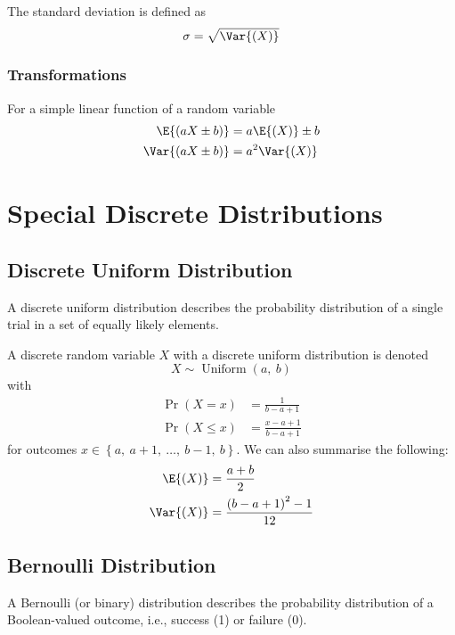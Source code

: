 \documentclass{article}
\begin{document}
\begin{definition}
    The standard deviation is defined as
    \begin{equation*}
        \sigma = \sqrt{\Var{\left( X \right)}}
    \end{equation*}
\end{definition}
\subsubsection{Transformations}
For a simple linear function of a random variable
\begin{align*}
    \E{\left( aX \pm b \right)}   & = a\E{\left( X \right)} \pm b \\
    \Var{\left( aX \pm b \right)} & = a^2\Var{\left( X \right)}
\end{align*}
\section{Special Discrete Distributions}
\subsection{Discrete Uniform Distribution}
A discrete uniform distribution describes the probability distribution of a single trial
in a set of equally likely elements.

A discrete random variable \(X\) with a discrete uniform distribution is denoted
\begin{equation*}
    X \sim \operatorname{Uniform}{\left( a,\: b \right)}
\end{equation*}
with
\begin{align*}
    \Pr{\left( X = x \right)}    & = \frac{1}{b - a + 1}         \\
    \Pr{\left( X \leq x \right)} & = \frac{x - a + 1}{b - a + 1}
\end{align*}
for outcomes \(x \in \left\{ a,\: a + 1,\: \dots,\: b - 1,\: b \right\}\).
We can also summarise the following:
\begin{align*}
    \E{\left( X \right)}   & = \frac{a + b}{2}                           \\
    \Var{\left( X \right)} & = \frac{\left( b - a + 1 \right)^2 - 1}{12}
\end{align*}
\subsection{Bernoulli Distribution}
A Bernoulli (or binary) distribution describes the probability distribution of a Boolean-valued
outcome, i.e., success (1) or failure (0).
\end{document}
